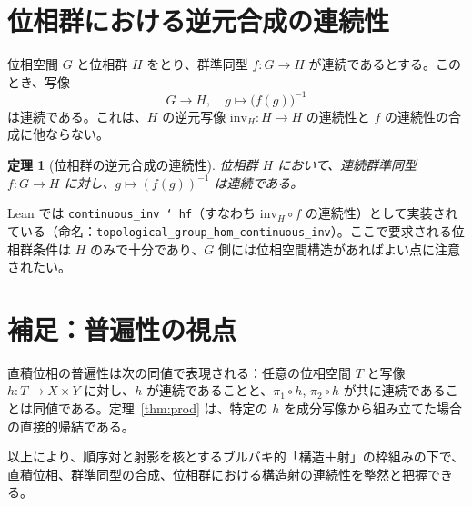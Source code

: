 \documentclass[a4paper,11pt]{jsarticle}
\newtheorem{theorem}{定理}
\theoremstyle{definition}
\begin{document}
\section{位相群における逆元合成の連続性}
位相空間 $G$ と位相群 $H$ をとり、群準同型 $f : G\to H$ が連続であるとする。このとき、写像
\[
  G \to H,\quad g \mapsto \bigl(f(g)\bigr)^{-1}
\]
は連続である。これは、$H$ の逆元写像 $\mathrm{inv}_H : H\to H$ の連続性と $f$ の連続性の合成に他ならない。

\begin{theorem}[位相群の逆元合成の連続性]
\label{thm:tgp-inv}
位相群 $H$ において、連続群準同型 $f : G\to H$ に対し、$g\mapsto (f(g))^{-1}$ は連続である。
\end{theorem}

\noindent Lean では \texttt{continuous\_inv \char`\comp\ hf}（すなわち $\mathrm{inv}_H\circ f$ の連続性）として実装されている（命名：\texttt{topological\_group\_hom\_continuous\_inv}）。ここで要求される位相群条件は $H$ のみで十分であり、$G$ 側には位相空間構造があればよい点に注意されたい。

\section{補足：普遍性の視点}
直積位相の普遍性は次の同値で表現される：任意の位相空間 $T$ と写像 $h:T\to X\times Y$ に対し、$h$ が連続であることと、$\pi_1\circ h$, $\pi_2\circ h$ が共に連続であることは同値である。定理~\ref{thm:prod} は、特定の $h$ を成分写像から組み立てた場合の直接的帰結である。

\bigskip
\noindent 以上により、順序対と射影を核とするブルバキ的「構造＋射」の枠組みの下で、直積位相、群準同型の合成、位相群における構造射の連続性を整然と把握できる。
\end{document}
